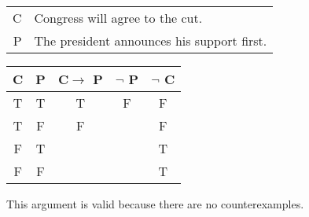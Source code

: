 \begin{tabular}{r l}
    C & Congress will agree to the cut. \\
    P & The president announces his support first.
\end{tabular}

\begin{tabular}{c|c||c|c||c}
    C & P & C$\rightarrow$ P & $\lnot$ P & $\lnot$ C \\
    \hline
    T & T & T & F & F \\
    T & F & F &   & F \\
    F & T &   &   & T \\
    F & F &   &   & T
\end{tabular}

\noindent This argument is valid because there are no counterexamples.